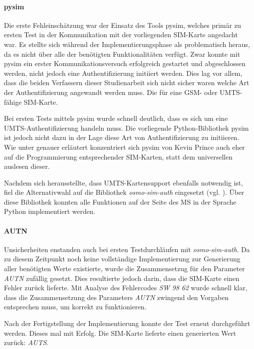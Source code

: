 		\paragraph{pysim}
		Die erste Fehleinschätzung war der Einsatz des Tools pysim, welches
		primär zu ersten Test in der Kommunikation mit der vorliegenden
		SIM-Karte angedacht war. Es stellte sich während der Implementierungsphase
		als problematisch heraus, da es nicht über alle der benötigten 
		Funktionalitäten verfügt. Zwar konnte mit pysim ein erster
		Kommunikationsversuch erfolgreich gestartet und abgeschlossen werden,
		nicht jedoch eine Authentifizierung initiiert werden. Dies lag
		vor allem, dass die beiden Verfassern dieser Studienarbeit sich nicht
		sicher waren welche Art der Authentifizierung angewandt werden muss.
		Die für eine GSM- oder UMTS-fähige SIM-Karte.

		Bei ersten Tests mittels pysim wurde schnell deutlich, dass es
		sich um eine UMTS-Authentifizierung handeln muss. Die vorliegende
		Python-Bibliothek pysim ist jedoch nicht dazu in der Lage diese
		Art von Authentifizierung zu initiieren. Wie unter 
		genauer erläutert konzentriert sich pysim von Kevin Prince auch
		eher auf die Programmierung entsprechender SIM-Karten, statt
		dem universellen auslesen dieser.

		Nachdem sich herausstellte, dass \ac{UMTS}-Kartensupport ebenfalls 
		notwendig ist, fiel die Alternativwahl
		auf die Bibliothek \textit{osmo-sim-auth} eingesetzt
		(vgl. ). Über diese Bibliothek konnten
		alle Funktionen auf der Seite des \ac{MS} in der Sprache Python
		implementiert werden.

		\paragraph{AUTN} Unsicherheiten enstanden auch bei ersten Testdurchläufen
		mit \textit{osmo-sim-auth}. Da zu diesem Zeitpunkt noch keine 
		vollständige Implementierung zur Generierung aller benötigten
		Werte existierte, wurde die Zusammensetzug für den
		Parameter \textit{AUTN} zufällig gesetzt. Dies resultierte jedoch
		darin, dass die SIM-Karte einen Fehler zurück lieferte. Mit
		Analyse des Fehlercodes \textit{SW 98 62} wurde schnell klar,
		dass die Zusammensetzung des Parameters \textit{AUTN} zwingend
		den Vorgaben entsprechen muss, um korrekt zu funktionieren.

		Nach der Fertigstellung der Implementierung konnte der Test erneut
		durchgeführt werden. Dieses mal mit Erfolg. Die SIM-Karte lieferte
		einen generierten Wert zurück: \textit{AUTS}.

